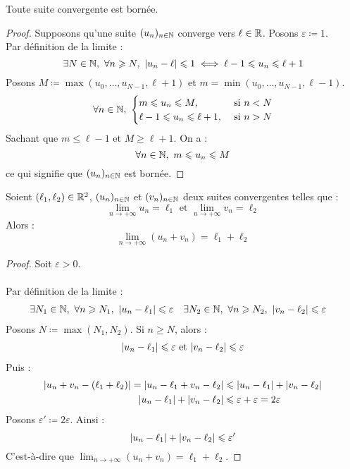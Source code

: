 \begin{theorem}
    Toute suite convergente est bornée.
\end{theorem}

\begin{proof}
    Supposons qu'une suite $(u_n)_{n \in \mathbb{N}}$ converge vers $\ell \in \mathbb{R}$.
    Posons $\varepsilon \coloneqq 1$. 
    \\
    Par définition de la limite :
    \[ \exists N \in \mathbb{N},\ \forall n \geqslant N,\ \abs{u_n - \ell} \leqslant 1 \iff \ell - 1 \leqslant u_n \leqslant \ell + 1 \]
    Posons $M \coloneqq \max(u_0, \ldots, u_{N-1}, \ell + 1)$ et $m = \min(u_0, \ldots, u_{N - 1}, \ell - 1)$.
    \begin{align*}
        \forall n \in \N,\ 
        \begin{cases}
            m \leq u_n \leq M, &\text{ si } n < N \\
            \ell - 1 \leq u_n \leq \ell + 1, &\text{ si } n > N
        \end{cases}
    \end{align*}
    Sachant que $m \leq \ell - 1$ et $M \geq \ell + 1$.
    On a :
    \[ \forall n \in \mathbb{N},\ m \leqslant u_n \leqslant M \]
    ce qui signifie que $(u_n)_{n \in \mathbb{N}}$ est bornée.
\end{proof}

\begin{theorem}
    Soient $(\ell_1, \ell_2) \in \mathbb{R}^2$, $(u_n)_{n \in \mathbb{N}}$ et $(v_n)_{n \in \mathbb{N}}$ deux suites convergentes telles que :
    \[ \lim_{n \to +\infty} u_n = \ell_1 \text{ et } \lim_{n \to +\infty} v_n = \ell_2 \]
    Alors :
    \[ \lim_{n \to +\infty} (u_n + v_n) = \ell_1 + \ell_2 \]
\end{theorem}

\begin{proof}
    Soit $\varepsilon > 0$.
    \\
    \\
    Par définition de la limite :
    \begin{align*}
        &\exists N_1 \in \mathbb{N},\ \forall n \geqslant N_1,\ \abs{u_n - \ell_1} \leqslant \varepsilon &
        &\exists N_2 \in \mathbb{N},\ \forall n \geqslant N_2,\ \abs{v_n - \ell_2} \leqslant \varepsilon
    \end{align*}
    Posons $N \coloneqq \max(N_1, N_2)$. Si $n \geq N$, alors :
    \begin{align*}
        \abs{u_n - \ell_1} \leqslant \varepsilon \text{ et } \abs{v_n - \ell_2} \leqslant \varepsilon
    \end{align*}
    Puis : 
    \begin{align*}
        \abs{u_n + v_n - (\ell_1 + \ell_2)} = \abs{u_n - \ell_1 + v_n - \ell_2} &\leqslant \abs{u_n - \ell_1} + \abs{v_n - \ell_2} \\
        \abs{u_n - \ell_1} + \abs{v_n - \ell_2} &\leqslant \varepsilon + \varepsilon = 2 \varepsilon
    \end{align*}
    Posons $\varepsilon' \coloneqq 2\varepsilon$.
    Ainsi : 
    \[ \abs{u_n - \ell_1} + \abs{v_n - \ell_2} \leqslant \varepsilon' \]
    C'est-à-dire que $\lim_{n \to +\infty} (u_n + v_n) = \ell_1 + \ell_2$.
\end{proof}

